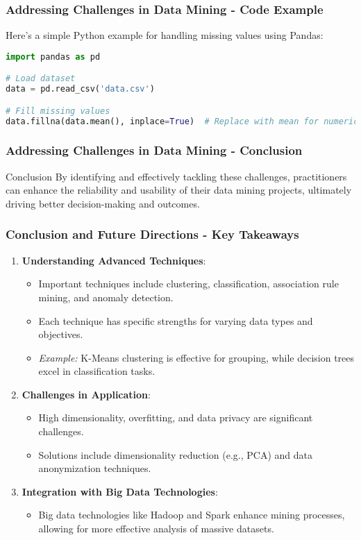 \documentclass{beamer}
\begin{document}
\begin{frame}[fragile]
    \frametitle{Addressing Challenges in Data Mining - Code Example}
    Here’s a simple Python example for handling missing values using Pandas:
    \begin{lstlisting}[language=python]
import pandas as pd

# Load dataset
data = pd.read_csv('data.csv')

# Fill missing values
data.fillna(data.mean(), inplace=True)  # Replace with mean for numerical columns
    \end{lstlisting}
\end{frame}

\begin{frame}[fragile]
    \frametitle{Addressing Challenges in Data Mining - Conclusion}
    \begin{block}{Conclusion}
        By identifying and effectively tackling these challenges, practitioners can enhance the reliability and usability of their data mining projects, ultimately driving better decision-making and outcomes.
    \end{block}
\end{frame}

\begin{frame}[fragile]
    \frametitle{Conclusion and Future Directions - Key Takeaways}
    \begin{enumerate}
        \item \textbf{Understanding Advanced Techniques}:
        \begin{itemize}
            \item Important techniques include clustering, classification, association rule mining, and anomaly detection.
            \item Each technique has specific strengths for varying data types and objectives.
            \item \textit{Example:} K-Means clustering is effective for grouping, while decision trees excel in classification tasks.
        \end{itemize}

        \item \textbf{Challenges in Application}:
        \begin{itemize}
            \item High dimensionality, overfitting, and data privacy are significant challenges.
            \item Solutions include dimensionality reduction (e.g., PCA) and data anonymization techniques.
        \end{itemize}

        \item \textbf{Integration with Big Data Technologies}:
        \begin{itemize}
            \item Big data technologies like Hadoop and Spark enhance mining processes, allowing for more effective analysis of massive datasets.
        \end{itemize}
    \end{enumerate}
\end{frame}
\end{document}
